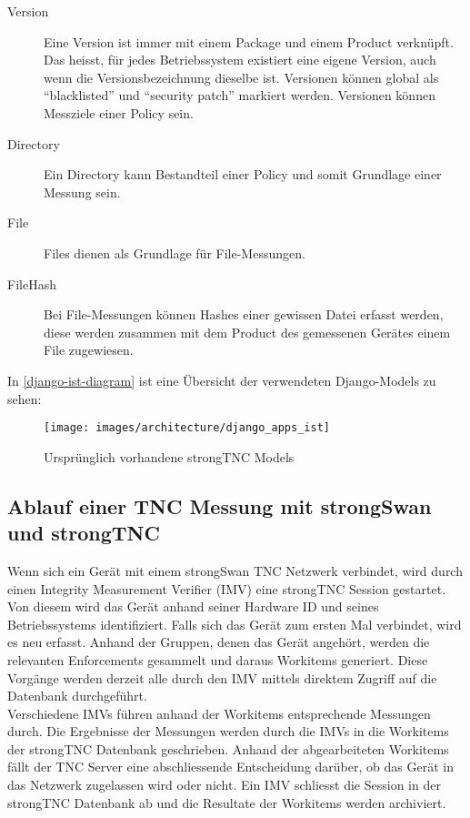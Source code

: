 \begin{description}
	\item[Version] Eine Version ist immer mit einem Package und einem Product
	verknüpft. Das heisst, für jedes Betriebssystem existiert eine eigene Version,
	auch wenn die Versionsbezeichnung dieselbe ist. Versionen können global als
	\enquote{blacklisted} und \enquote{security patch} markiert werden. Versionen
	können Messziele einer Policy sein.

	\item[Directory] Ein Directory kann Bestandteil einer Policy und somit
	Grundlage einer Messung sein.

	\item[File] Files dienen als Grundlage für File-Messungen.

	\item[FileHash] Bei File-Messungen können Hashes einer gewissen Datei erfasst
	werden, diese werden zusammen mit dem Product des gemessenen Gerätes einem
	File zugewiesen.
	
\end{description}

In \autoref{django-ist-diagram} ist eine Übersicht der verwendeten Django-Models
zu sehen:
\begin{figure}[H]
	\centering
	\texttt{[image: images/architecture/django\_apps\_ist]}
	\caption{Ursprünglich vorhandene strongTNC Models}
	\label{django-ist-diagram}
\end{figure}

\subsection{Ablauf einer TNC Messung mit strongSwan und strongTNC}

Wenn sich ein Gerät mit einem strongSwan TNC Netzwerk verbindet, wird durch
einen Integrity Measurement Verifier (IMV) eine strongTNC Session gestartet.
Von diesem wird das Gerät anhand seiner Hardware ID und seines Betriebssystems
identifiziert. Falls sich das Gerät zum ersten Mal verbindet, wird es neu
erfasst. Anhand der Gruppen, denen das Gerät angehört, werden die relevanten
Enforcements gesammelt und daraus Workitems generiert. Diese Vorgänge werden
derzeit alle durch den IMV mittels direktem Zugriff auf die Datenbank
durchgeführt.\\
Verschiedene IMVs führen anhand der Workitems entsprechende Messungen durch. Die
Ergebnisse der Messungen werden durch die IMVs in die Workitems der strongTNC
Datenbank geschrieben. Anhand der abgearbeiteten Workitems fällt der TNC Server
eine abschliessende Entscheidung darüber, ob das Gerät in das Netzwerk
zugelassen wird oder nicht. Ein IMV schliesst die Session in der strongTNC
Datenbank ab und die Resultate der Workitems werden archiviert.

